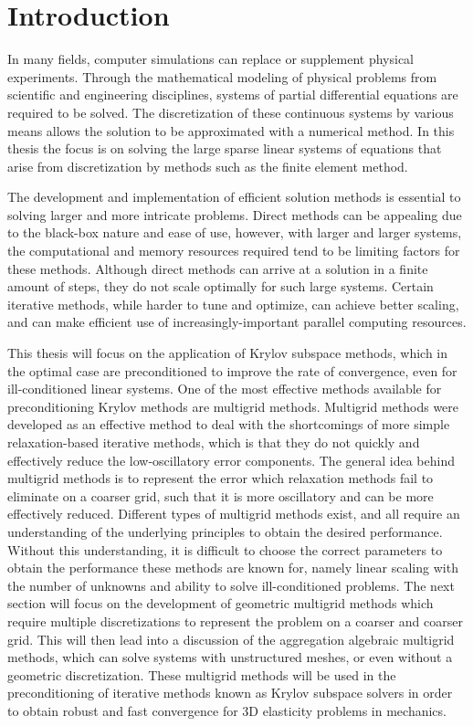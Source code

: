 \chapter{Introduction}
\label{chapter:Introduction}

In many fields, computer simulations can replace or supplement physical experiments. Through the mathematical modeling of physical problems from scientific and engineering disciplines, systems of partial differential equations are required to be solved. The discretization of these continuous systems by various means allows the solution to be approximated with a numerical method. In this thesis the focus is on solving the large sparse linear systems of equations that arise from discretization by methods such as the finite element method.

The development and implementation of efficient solution methods is essential to solving larger and more intricate problems. Direct methods can be appealing due to the black-box nature and ease of use, however, with larger and larger systems, the computational and memory resources required tend to be limiting factors for these methods. Although direct methods can arrive at a solution in a finite amount of steps, they do not scale optimally for such large systems. Certain iterative methods, while harder to tune and optimize, can achieve better scaling, and can make efficient use of increasingly-important parallel computing resources.

This thesis will focus on the application of Krylov subspace methods, which in the optimal case are preconditioned to improve the rate of convergence, even for ill-conditioned linear systems. One of the most effective methods available for preconditioning Krylov methods are multigrid methods. Multigrid methods were developed as an effective method to deal with the shortcomings of more simple relaxation-based iterative methods, which is that they do not quickly and effectively reduce the low-oscillatory error components. The general idea behind multigrid methods is to represent the error which relaxation methods fail to eliminate on a coarser grid, such that it is more oscillatory and can be more effectively reduced. Different types of multigrid methods exist, and all require an understanding of the underlying principles to obtain the desired performance. Without this understanding, it is difficult to choose the correct parameters to obtain the performance these methods are known for, namely linear scaling with the number of unknowns and ability to solve ill-conditioned problems. The next section will focus on the development of geometric multigrid methods which require multiple discretizations to represent the problem on a coarser and coarser grid. This will then lead into a discussion of the aggregation algebraic multigrid methods, which can solve systems with unstructured meshes, or even without a geometric discretization. These multigrid methods will be used in the preconditioning of iterative methods known as Krylov subspace solvers in order to obtain robust and fast convergence for 3D elasticity problems in mechanics.
 